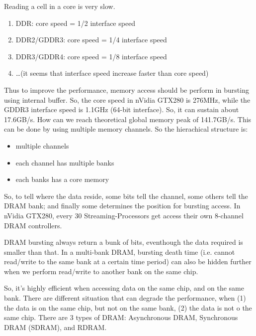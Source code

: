 Reading a cell in
a core is very slow.
\begin{enumerate}
  \item DDR: core speed = 1/2 interface speed
  \item DDR2/GDDR3: core speed = 1/4 interface speed
  \item DDR3/GDDR4: core speed = 1/8 interface speed
  \item \ldots (it seems that interface speed increase faster than core speed)
\end{enumerate}
Thus to improve the performance, memory access should be perform in bursting using internal
  buffer. 
So, the core speed in nVidia GTX280 is 276MHz, while the GDDR3 interface speed
is 1.1GHz (64-bit interface). So, it can sustain about 17.6GB/s. How can we
reach theoretical global memory peak of 141.7GB/s. This can be done by using
multiple memory channels. So the hierachical structure is:
\begin{itemize}
  \item multiple channels
  \item each channel has multiple banks
  \item each banks has a core memory
\end{itemize}
So, to tell where the data reside, some bits tell the channel, some others tell
the DRAM bank; and finally some determines the position for bursting access.    
In nVidia GTX280, every 30 Streaming-Processors get access their own 8-channel DRAM controllers. 

DRAM bursting always return a bunk of bits, eventhough the data required is
smaller than that. In a multi-bank DRAM, bursting death time (i.e. cannot
read/write to the same bank at a certain time period) can also be hidden further
when we perform read/write to another bank on the same chip.

So, it's highly efficient when accessing data on the same chip, and on the
same bank. There are different situation that can degrade the performance, when
(1) the data is on the same chip, but not on the same bank, (2) the data is not
o the same chip. There are 3 types of DRAM: Asynchronous DRAM, Synchronous DRAM
(SDRAM), and RDRAM. 


